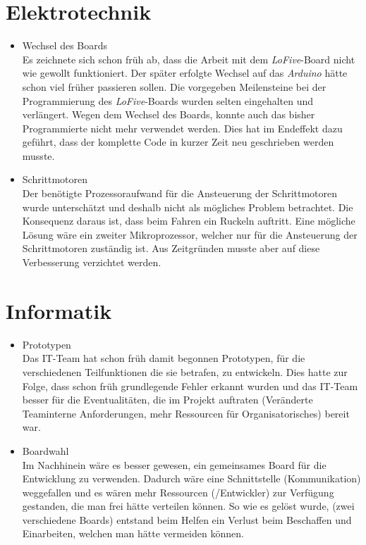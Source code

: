 \documentclass[a4paper]{report}
\begin{document}
\section{Elektrotechnik}
\begin{itemize}
	\item Wechsel des Boards\\
	Es zeichnete sich schon früh ab, dass die Arbeit mit dem \textit{LoFive}-Board nicht wie gewollt funktioniert. Der später erfolgte Wechsel auf das \textit{Arduino} hätte schon viel früher passieren sollen. Die vorgegeben Meilensteine bei der Programmierung des \textit{LoFive}-Boards wurden selten eingehalten und verlängert. Wegen dem Wechsel des Boards, konnte auch das bisher Programmierte nicht mehr verwendet werden. Dies hat im Endeffekt dazu geführt, dass der komplette Code in kurzer Zeit neu geschrieben werden musste.
	\item Schrittmotoren\\
	Der benötigte Prozessoraufwand für die Ansteuerung der Schrittmotoren wurde unterschätzt und deshalb nicht als mögliches Problem betrachtet. Die Konsequenz daraus ist, dass beim Fahren ein Ruckeln auftritt. Eine mögliche Lösung wäre ein zweiter Mikroprozessor, welcher nur für die Ansteuerung der Schrittmotoren zuständig ist. Aus Zeitgründen musste aber auf diese Verbesserung verzichtet werden.
\end{itemize}

\section{Informatik}
\begin{itemize}
	\item Prototypen\\
	Das IT-Team hat schon früh damit begonnen Prototypen, für die verschiedenen Teilfunktionen die sie betrafen, zu entwickeln. Dies hatte zur Folge, dass schon früh grundlegende Fehler erkannt wurden und das IT-Team besser für die Eventualitäten, die im Projekt auftraten (Veränderte Teaminterne Anforderungen, mehr Ressourcen für Organisatorisches) bereit war.

	\item Boardwahl\\
	Im Nachhinein wäre es besser gewesen, ein gemeinsames Board für die Entwicklung zu verwenden. Dadurch wäre eine Schnittstelle (Kommunikation) weggefallen und es wären mehr Ressourcen (/Entwickler) zur Verfügung gestanden, die man frei hätte verteilen können. So wie es gelöst wurde, (zwei verschiedene Boards) entstand beim Helfen ein Verlust beim Beschaffen und Einarbeiten, welchen man hätte vermeiden können.

\end{itemize}
\end{document}
